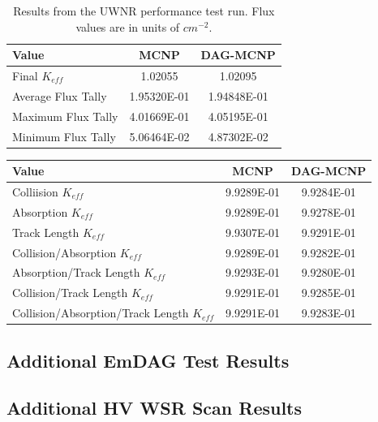 \documentclass[12pt, a4paper]{article}
\begin{document}
\begin{table}[H]
  \centering
  \caption{Results from the UWNR performance test run. Flux values are in units of $cm^{-2}$.}
  \label{uwnr_perf_results}
  \begin{tabular}{l c c}
    \toprule
    Value & MCNP & DAG-MCNP \\
    \hline
    Final $K_{eff}$ & 1.02055 & 1.02095 \\
    \hline
    Average Flux Tally & 1.95320E-01 & 1.94848E-01 \\
    \hline
    Maximum Flux Tally & 4.01669E-01 & 4.05195E-01 \\
    \hline
    Minimum Flux Tally & 5.06464E-02 & 4.87302E-02 \\
    \bottomrule
  \end{tabular}
\end{table}

\begin{table}[H]
  \centering
  \begin{tabular}{l c c}
    \toprule
    Value & MCNP & DAG-MCNP \\
    \hline
    Colliision $K_{eff}$ & 9.9289E-01 &  9.9284E-01 \\
    \hline
    Absorption $K_{eff}$ & 9.9289E-01 & 9.9278E-01 \\
    \hline
    Track Length $K_{eff}$ & 9.9307E-01 & 9.9291E-01 \\
    \hline
    Collision/Absorption $K_{eff}$ & 9.9289E-01 & 9.9282E-01 \\
    \hline
    Absorption/Track Length $K_{eff}$ & 9.9293E-01 & 9.9280E-01 \\
    \hline
    Collision/Track Length $K_{eff}$ & 9.9291E-01 & 9.9285E-01 \\
    \hline 
    Collision/Absorption/Track Length $K_{eff}$ & 9.9291E-01 & 9.9283E-01 \\
    \bottomrule    
  \end{tabular}
\end{table}

\subsection{Additional EmDAG Test Results}%

\subsection{Additional HV WSR Scan Results}%
\end{document}

